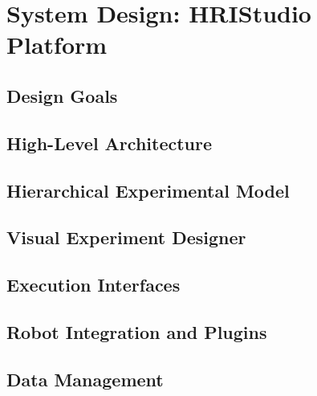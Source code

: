 \chapter{System Design: HRIStudio Platform}
\label{ch:design}

\section{Design Goals}

\section{High-Level Architecture}

\section{Hierarchical Experimental Model}

\section{Visual Experiment Designer}

\section{Execution Interfaces}

\section{Robot Integration and Plugins}

\section{Data Management}
